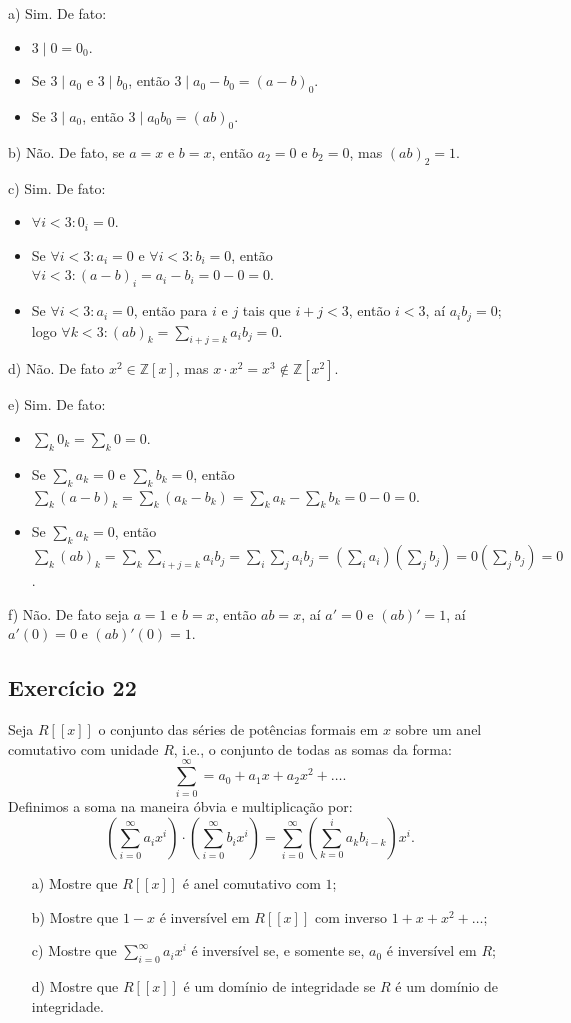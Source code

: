 \documentclass[10pt,a4paper]{article}
\begin{document}
a) Sim. De fato:
\begin{itemize}
\item $3\mid 0=0_0$.
\item Se $3\mid a_0$ e $3\mid b_0$, então $3\mid a_0-b_0=(a-b)_0$.
\item Se $3\mid a_0$, então $3\mid a_0b_0=(ab)_0$.
\end{itemize}

\noindent
b) Não. De fato, se $a=x$ e $b=x$, então $a_2=0$ e $b_2=0$, mas $(ab)_2=1$.

\medskip
\noindent
c) Sim. De fato:
\begin{itemize}
\item $\forall i<3:0_i=0$.
\item Se $\forall i<3:a_i=0$ e $\forall i<3:b_i=0$, então $\forall i<3:(a-b)_i=a_i-b_i=0-0=0$.
\item Se $\forall i<3:a_i=0$, então para $i$ e $j$ tais que $i+j<3$, então $i<3$, aí $a_ib_j=0$; logo $\forall k<3:(ab)_k=\sum_{i+j=k}a_ib_j=0$.
\end{itemize}

\noindent
d) Não. De fato $x^2\in\mathbb{Z}[x]$, mas $x\cdot x^2=x^3\notin\mathbb{Z}[x^2]$.

\medskip
\noindent
e) Sim. De fato:
\begin{itemize}
\item $\sum_k0_k=\sum_k0=0$.
\item Se $\sum_ka_k=0$ e $\sum_kb_k=0$, então $\sum_k(a-b)_k=\sum_k(a_k-b_k)=\sum_ka_k-\sum_kb_k=0-0=0$.
\item Se $\sum_ka_k=0$, então $\sum_k(ab)_k=\sum_k\sum_{i+j=k}a_ib_j=\sum_i\sum_ja_ib_j=\left(\sum_ia_i\right)\left(\sum_jb_j\right)=0\left(\sum_jb_j\right)=0$.
\end{itemize}

\noindent
f) Não. De fato seja $a=1$ e $b=x$, então $ab=x$, aí $a'=0$ e $(ab)'=1$, aí $a'(0)=0$ e $(ab)'(0)=1$.

\subsection*{Exercício 22}
Seja $R[[x]]$ o conjunto das séries de potências formais em $x$ sobre um anel comutativo com unidade $R$, i.e., o conjunto de todas as somas da forma:
\[
\sum_{i=0}^\infty=a_0+a_1x+a_2x^2+\dots.
\]
Definimos a soma na maneira óbvia e multiplicação por:
\[
\left(\sum_{i=0}^\infty a_ix^i\right)\cdot\left(\sum_{i=0}^\infty b_ix^i\right)=\sum_{i=0}^\infty\left(\sum_{k=0}^ia_kb_{i-k}\right)x^i.
\]
\begin{itemize}
\item[a)] Mostre que $R[[x]]$ é anel comutativo com $1$;
\item[b)] Mostre que $1-x$ é inversível em $R[[x]]$ com inverso $1+x+x^2+\dots$;
\item[c)] Mostre que $\sum_{i=0}^\infty a_i x^i$ é inversível se, e somente se, $a_0$ é inversível em $R$;
\item[d)] Mostre que $R[[x]]$ é um domínio de integridade se $R$ é um domínio de integridade.
\end{itemize}
\end{document}
